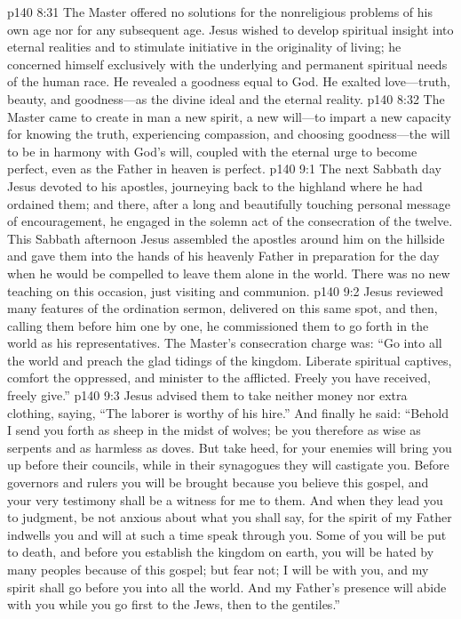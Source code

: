 \vs p140 8:31 The Master offered no solutions for the nonreligious problems of his own age nor for any subsequent age. Jesus wished to develop spiritual insight into eternal realities and to stimulate initiative in the originality of living; he concerned himself exclusively with the underlying and permanent spiritual needs of the human race. He revealed a goodness equal to God. He exalted love---truth, beauty, and goodness---as the divine ideal and the eternal reality.
\vs p140 8:32 The Master came to create in man a new spirit, a new will---to impart a new capacity for knowing the truth, experiencing compassion, and choosing goodness---the will to be in harmony with God’s will, coupled with the eternal urge to become perfect, even as the Father in heaven is perfect.
\vs p140 9:1 The next Sabbath day Jesus devoted to his apostles, journeying back to the highland where he had ordained them; and there, after a long and beautifully touching personal message of encouragement, he engaged in the solemn act of the consecration of the twelve. This Sabbath afternoon Jesus assembled the apostles around him on the hillside and gave them into the hands of his heavenly Father in preparation for the day when he would be compelled to leave them alone in the world. There was no new teaching on this occasion, just visiting and communion.
\vs p140 9:2 Jesus reviewed many features of the ordination sermon, delivered on this same spot, and then, calling them before him one by one, he commissioned them to go forth in the world as his representatives. The Master’s consecration charge was: \textcolor{ubdarkred}{“Go into all the world and preach the glad tidings of the kingdom. Liberate spiritual captives, comfort the oppressed, and minister to the afflicted. Freely you have received, freely give.”}
\vs p140 9:3 Jesus advised them to take neither money nor extra clothing, saying, \textcolor{ubdarkred}{“The laborer is worthy of his hire.”} And finally he said: \textcolor{ubdarkred}{“Behold I send you forth as sheep in the midst of wolves; be you therefore as wise as serpents and as harmless as doves. But take heed, for your enemies will bring you up before their councils, while in their synagogues they will castigate you. Before governors and rulers you will be brought because you believe this gospel, and your very testimony shall be a witness for me to them. And when they lead you to judgment, be not anxious about what you shall say, for the spirit of my Father indwells you and will at such a time speak through you. Some of you will be put to death, and before you establish the kingdom on earth, you will be hated by many peoples because of this gospel; but fear not; I will be with you, and my spirit shall go before you into all the world. And my Father’s presence will abide with you while you go first to the Jews, then to the gentiles.”}
